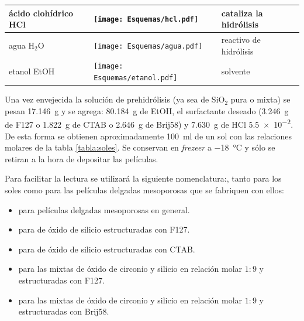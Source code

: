 \begin{table}[ht!]
\begin{tabular}{>{\raggedright\arraybackslash}m{2.40cm}>{\centering\arraybackslash}m{4cm}>{\centering\arraybackslash}m{2.35cm}>{\raggedright\arraybackslash}m{1.7cm}}
				  		  ácido\index{acido@ácido} clohídrico\index{acido@ácido!clohídrico} HCl\index{acido@ácido!clohídrico}& \texttt{[image: Esquemas/hcl.pdf]}  & \multirow{1}{*}{$36,46$}   & cataliza la hidrólisis\index{hidrolisis@hidrólisis} \\ \midrule
				  		  agua \hspace{2cm} H$_2$O  &  \texttt{[image: Esquemas/agua.pdf]}  & \multirow{1}{*}{$18,02$}   & reactivo de hidrólisis\index{hidrolisis@hidrólisis} \\ \midrule
				  		  etanol\index{etanol} \hspace{2cm} EtOH\index{etanol}  & \texttt{[image: Esquemas/etanol.pdf]}  & \multirow{1}{*}{$46,07$}   & solvente \\ 
				  		  \bottomrule
				    	  \end{tabular}
				   		  \label{tabla:reactivos}
					      \end{table}

			Una vez envejecida la solución de prehidrólisis (ya sea de SiO$_2$ pura o mixta) se pesan  \SI{17.146}{\gram} y se agrega: \SI{80.184}{\gram} de EtOH, el surfactante deseado (\SI{3.246}{\gram} de F127 o \SI{1.822}{\gram} de CTAB o \SI{2.646}{\gram} de Brij58\index{Brij58}) y \SI{7.630}{\gram} de HCl \SI{5,5e-2}{\Molar}. De esta forma se obtienen aproximadamente \SI{100}{\ml} de un sol con las relaciones molares de la tabla \ref{tabla:soles}. Se conservan en \textit{frezeer} a \SI{-18}{\celsius} y sólo se retiran a la hora de depositar las películas. 

			Para facilitar la lectura se utilizará la siguiente nomenclatura:, tanto para los soles como para las películas delgadas mesoporosas que se fabriquen con ellos: 

				\begin{itemize}
			     \item \pdm\space para películas delgadas mesoporosas en general.
			     \item \pdmF\space para \pdm\space de óxido de silicio estructuradas con F127. 
			     \item \pdmC\space para \pdm\space de óxido de silicio estructuradas con CTAB.
			     \item \pdmZ\space para las \pdm\space mixtas de óxido de circonio y silicio en relación molar $1\!:\!9$ y estructuradas con F127.
			     \item \pdmZB\space para las \pdm\space mixtas de óxido de circonio y silicio en relación molar $1\!:\!9$ y estructuradas con Brij58\index{Brij58}. 
      		     \end{itemize}	
			
